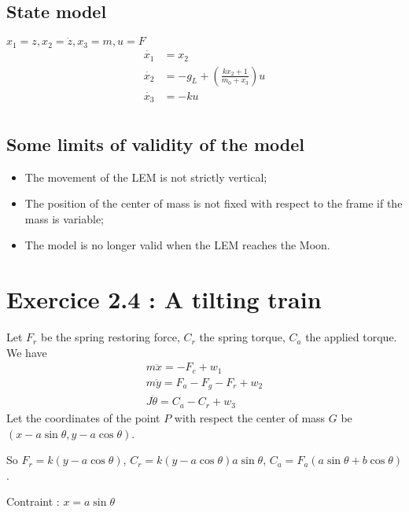 \subsection{State model}
$x_1 = z, x_2 = \dot{z}, x_3 = m, u = F$
\begin{align*}
\dot{x_1} &= x_2\\
\dot{x_2} &= -g_L + \left(\frac{kx_2+1}{m_0+x_3}\right)u \\
\dot{x_3} &= -ku\\
\end{align*}

\subsection{Some limits of validity of the model}
\begin{itemize}
\item The movement of the LEM is not strictly vertical;
\item The position of the center of mass is not fixed with respect to the frame if the mass is variable;
\item The model is no longer valid when the LEM reaches the Moon.
\end{itemize}

\section{Exercice 2.4 : A tilting train}
Let $F_r$ be the spring restoring force, $C_r$ the spring torque, $C_a$ the applied torque. We have
\begin{align*}
m\ddot{x} = -F_c +w_1\\
m\ddot{y} = F_a - F_g - F_r +w_2\\
J\ddot{\theta} = C_a - C_r + w_3
\end{align*}
Let the coordinates of the point $P$ with respect the center of mass $G$ be $(x-a\sin\theta, y - a\cos\theta)$.

So $F_r = k (y-a\cos\theta)$, $C_r = k(y-a\cos\theta)a\sin\theta$, $C_a = F_a(a\sin\theta + b \cos\theta)$.

Contraint : $x = a\sin\theta$

